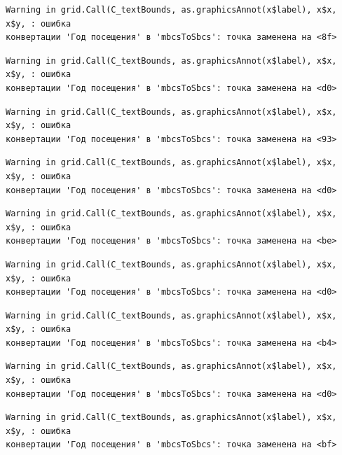 \documentclass[
  letterpaper,
  DIV=11,
  numbers=noendperiod]{scrreprt}
\begin{document}
\begin{verbatim}
Warning in grid.Call(C_textBounds, as.graphicsAnnot(x$label), x$x, x$y, : ошибка
конвертации 'Год посещения' в 'mbcsToSbcs': точка заменена на <8f>
\end{verbatim}

\begin{verbatim}
Warning in grid.Call(C_textBounds, as.graphicsAnnot(x$label), x$x, x$y, : ошибка
конвертации 'Год посещения' в 'mbcsToSbcs': точка заменена на <d0>
\end{verbatim}

\begin{verbatim}
Warning in grid.Call(C_textBounds, as.graphicsAnnot(x$label), x$x, x$y, : ошибка
конвертации 'Год посещения' в 'mbcsToSbcs': точка заменена на <93>
\end{verbatim}

\begin{verbatim}
Warning in grid.Call(C_textBounds, as.graphicsAnnot(x$label), x$x, x$y, : ошибка
конвертации 'Год посещения' в 'mbcsToSbcs': точка заменена на <d0>
\end{verbatim}

\begin{verbatim}
Warning in grid.Call(C_textBounds, as.graphicsAnnot(x$label), x$x, x$y, : ошибка
конвертации 'Год посещения' в 'mbcsToSbcs': точка заменена на <be>
\end{verbatim}

\begin{verbatim}
Warning in grid.Call(C_textBounds, as.graphicsAnnot(x$label), x$x, x$y, : ошибка
конвертации 'Год посещения' в 'mbcsToSbcs': точка заменена на <d0>
\end{verbatim}

\begin{verbatim}
Warning in grid.Call(C_textBounds, as.graphicsAnnot(x$label), x$x, x$y, : ошибка
конвертации 'Год посещения' в 'mbcsToSbcs': точка заменена на <b4>
\end{verbatim}

\begin{verbatim}
Warning in grid.Call(C_textBounds, as.graphicsAnnot(x$label), x$x, x$y, : ошибка
конвертации 'Год посещения' в 'mbcsToSbcs': точка заменена на <d0>
\end{verbatim}

\begin{verbatim}
Warning in grid.Call(C_textBounds, as.graphicsAnnot(x$label), x$x, x$y, : ошибка
конвертации 'Год посещения' в 'mbcsToSbcs': точка заменена на <bf>
\end{verbatim}
\end{document}
